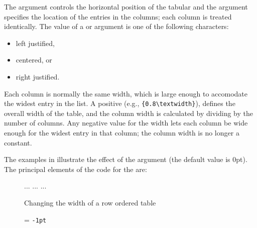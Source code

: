 {{{{{{\begin{figure}
 \label{tab:autorows}
\end{figure}

    The  argument controls the horizontal 
position of the
tabular and the  argument specifies the location of the
entries in the columns; each column 
is treated identically. The value
of a  or  argument is one of the following
characters:
\begin{itemize}
\item[\pixposarg{l}] left justified, 
\item[\pixposarg{c}] centered, or
\item[\pixposarg{r}] right justified. 
\end{itemize}

 Each column is normally the same 
width,
which is large enough to accomodate
the widest entry in the list.
A positive  (e.g., \verb?{0.8\textwidth}?), defines the overall
width of the table, and the column width is calculated by dividing 
by the number of columns. Any negative value for the  width lets 
each column be wide enough for the widest entry in that column; 
the column width is no longer a constant. 

   The examples in  illustrate the effect of the  
argument (the default value is 0pt). The principal elements of the code
for the \figurerefname{} are:
\begin{lcode}
\begin{figure}
...
...
...
\caption{Changing the width of a row ordered table} 
         \label{fig:arw}
\end{figure}
\end{lcode}

\begin{figure}
\centering
{} = \verb?-1pt? 


\end{figure}}}}}}}
